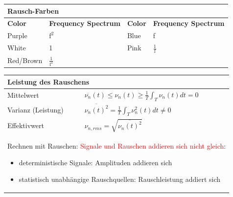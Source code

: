 \vspace{-2.5\topsep}
\begin{longtable}{|p{4.27cm}p{4.27cm}|p{4.27cm}p{4.27cm}|}
    \hline
    \multicolumn{4}{|l|}{\bf Rausch-Farben}
    \\ \hline
    \textbf{Color} & \textbf{Frequency Spectrum} & \textbf{Color} & \textbf{Frequency Spectrum}
    \\ \hline
    Purple         & $\mathrm{f^2}$              & Blue           & f\\
    White          & 1                           & Pink           & $\mathrm{\frac{1}{f}}$\\
    Red/Brown      & $\mathrm{\frac{1}{f^2}}$    &                & \\
    \hline
\end{longtable}
\vspace{-2.5\topsep}
\renewcommand{\arraystretch}{1.8}
\begin{longtable}{|p{5cm}|p{12.9cm}|}
    \hline
    \multicolumn{2}{|l|}{\bf Leistung des Rauschens}
    \\ \hline
    Mittelwert	
    & $\overline{\nu_{n}}(t)\leq \nu_{n}(t)\geq \frac{1}{T}\int_{T}\nu_{n}(t)dt=0$ 
    \\ \hline
    Varianz (Leistung)
    & $\overline{\nu_{n}(t)^2}=\frac{1}{T}\int_{T}\nu^2_{n}(t)dt\neq0$
    \\ \hline
    Effektivwert
    & $\nu_{n,rms}=\sqrt{\overline{\nu_{n}(t)^2}}$
    \\ \hline
    \multicolumn{2}{|l|}{\parbox{17.9cm}{\vspace{2mm}
        Rechnen mit Rauschen: \textcolor{red}{Signale und Rauschen addieren sich nicht gleich}:
        \begin{itemize}
            \item deterministische Signale: Amplituden addieren sich
            \item statistisch unabhängige Rauschquellen: Rauschleistung addiert sich
        \end{itemize}\vspace{2mm}}}
    \\ \hline
\end{longtable}
\vspace{-2.5\topsep}
